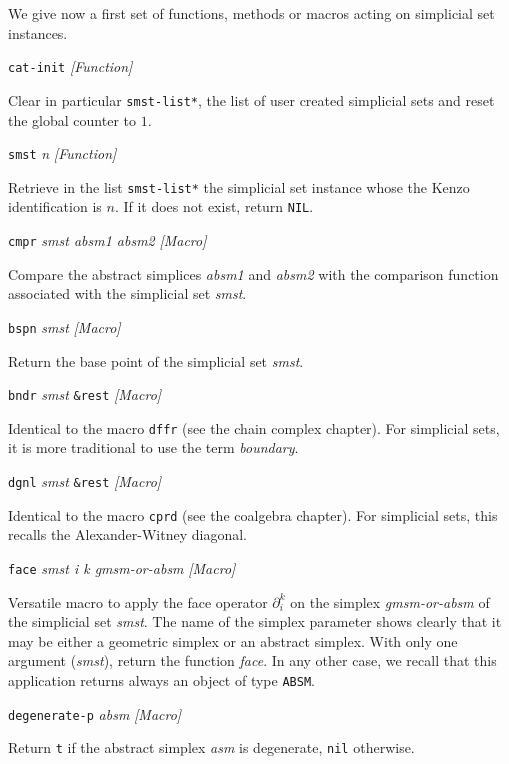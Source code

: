 We give now a first set of functions, methods or macros acting on  simplicial set instances.
\vskip 0.45cm
{\parindent=0mm
{\leftskip=5mm
{\tt cat-init} \hfill {\em [Function]} \par}
{\leftskip=15mm
Clear in particular {\tt *smst-list*}, the list of user created simplicial sets  and reset
the global counter to $1$. \par}
{\leftskip=5mm
{\tt smst} {\em n} \hfill {\em [Function]}\par}
{\leftskip=15mm
Retrieve in the list {\tt *smst-list*} the simplicial set instance whose the Kenzo identification
is $n$. If it does not exist, return {\tt NIL}. \par}
{\leftskip=5mm
{\tt cmpr} {\em smst  absm1 absm2} \hfill {\em [Macro]}\par}
{\leftskip=15mm
Compare the abstract simplices {\em absm1} and {\em absm2} with the comparison function
associated with the simplicial set {\em smst}. \par}
{\leftskip=5mm
{\tt bspn} {\em smst} \hfill {\em [Macro]}\par}
{\leftskip=15mm
Return the base point of the simplicial set {\em smst}. \par}
{\leftskip=5mm
{\tt bndr}  {\em smst} {\tt \&rest} \hfill {\em [Macro]}\par}
{\leftskip=15mm
Identical to the macro {\tt dffr} (see the chain complex chapter). For simplicial sets, it is more traditional to
use the term {\em boundary}. \par}
{\leftskip=5mm
{\tt dgnl} {\em smst} {\tt \&rest} \hfill {\em [Macro]}\par}
{\leftskip=15mm
Identical to  the macro {\tt cprd} (see the coalgebra chapter). For simplicial sets, this recalls the
Alexander-Witney diagonal. \par}
{\leftskip=5mm
{\tt face} {\em smst i k  gmsm-or-absm} \hfill {\em [Macro]}\par}
{\leftskip=15mm
Versatile macro to apply the face operator $\partial_i^k$ on the   simplex {\em gmsm-or-absm} of the simplicial set
{\em smst}. The name of the simplex parameter
shows clearly that it may be either a geometric simplex or an abstract simplex.
With only one argument ({\em smst}), return the function {\em face}.
In any other case, we recall that this application   returns always  an object of type {\tt ABSM}. \par}
{\leftskip=5mm
{\tt degenerate-p} {\em  absm} \hfill {\em [Macro]} \par}
{\leftskip=15mm
Return {\tt t} if the abstract simplex {\em asm} is degenerate, {\tt nil} otherwise. \par}
}
